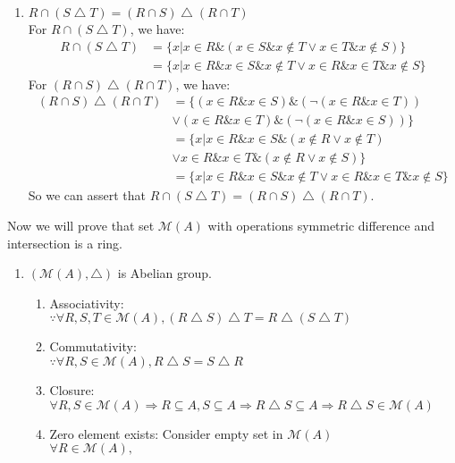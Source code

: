 \documentclass[12pt]{article}
\theoremstyle{neosn}
\begin{document}
\begin{enumerate}
        \item $R\cap (S \bigtriangleup T) = (R \cap S) \bigtriangleup (R \cap T)$\\
            For $R\cap (S \bigtriangleup T)$, we have:
            \begin{align*}
                R\cap (S \bigtriangleup T) &= \{x|x\in R \& (x\in S \& x\notin T \lor x\in T \& x\notin S)\}\\
                    &= \{x|x\in R \& x\in S \& x\notin T \lor x\in R \& x\in T \& x\notin S\}
            \end{align*}
            For $(R \cap S) \bigtriangleup (R \cap T)$, we have:
            \begin{align*}
                (R \cap S) \bigtriangleup (R \cap T) &= \{(x\in R \& x\in S) \& (\lnot (x\in R \& x\in T))\\
                        &\lor (x\in R \& x\in T) \& (\lnot (x\in R \& x\in S))\}\\
                        &= \{x|x\in R \& x\in S \& (x\notin R \lor x\notin T) \\
                        &\lor x\in R \& x\in T \& (x\notin R \lor x\notin S)\}\\
                        &= \{x|x\in R \& x\in S \& x\notin T \lor x\in R \& x\in T \& x\notin S\}
            \end{align*}
            So we can assert that $R\cap (S \bigtriangleup T) = (R \cap S) \bigtriangleup (R \cap T)$.
    \end{enumerate}

    Now we will prove that set $\mathscr{M}(A)$ with operations symmetric difference and intersection is a ring.\\
    \begin{enumerate}
        \item $(\mathscr{M}(A),\bigtriangleup)$ is Abelian group.\\
            \begin{enumerate}
                \item Associativity:\\
                    $\because \forall R,S,T \in \mathscr{M}(A), (R\bigtriangleup S)\bigtriangleup T =  R\bigtriangleup (S\bigtriangleup T)$\\
                \item Commutativity:\\
                    $\because \forall R,S \in \mathscr{M}(A), R\bigtriangleup S = S \bigtriangleup R$\\
                \item Closure:\\
                    $\forall R,S \in \mathscr{M}(A) \Rightarrow R \subseteq A, S \subseteq A \Rightarrow R\bigtriangleup S \subseteq A
                    \Rightarrow R\bigtriangleup S \in \mathscr{M}(A)$
                \item Zero element exists:
                    Consider empty set in $\mathscr{M}(A)$\\
                    $\forall R \in \mathscr{M}(A),$
            \end{enumerate}
    \end{enumerate}
\end{document}
